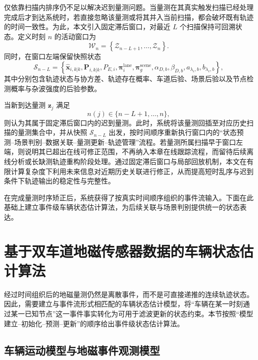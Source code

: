 \documentclass{xdupgthesis}
\begin{document}
仅依靠扫描内排序仍不足以解决迟到量测问题。当量测在其真实触发扫描已经处理完成后才到达系统时，若直接忽略该量测或将其并入当前扫描，都会破坏既有轨迹的时间一致性。为此，本文引入固定滞后窗口，对最近 $L$ 个扫描保持可回溯状态。定义时刻 $n$ 的活动窗口为
\begin{equation}
	\mathcal W_n=
	\left\{
	\mathcal Z_{n-L+1},\ldots,\mathcal Z_n
	\right\}.
	\label{eq:ch3_lag_window}
\end{equation}
同时，在窗口左端保留快照状态
\begin{equation}
	\mathcal S_{n-L}=
	\left\{
	\hat{\mathbf x}_{i,k|k},\mathbf P_{i,k|k},P_{E,i},
	\boldsymbol\pi_i^{\mathrm{lane}},
	\boldsymbol\pi_g^{\mathrm{scene}},
	\alpha_{D,b},\beta_{D,b},a_{\lambda_c,b},b_{\lambda_c,b}
	\right\},
	\label{eq:ch3_snapshot_reorg}
\end{equation}
其中分别包含轨迹状态与协方差、轨迹存在概率、车道后验、场景后验以及节点检测概率与杂波强度的后验参数。

当新到达量测 $\mathbf z_j$ 满足
\begin{equation}
	n(j)\in\{n-L+1,\ldots,n\},
	\label{eq:ch3_late_condition}
\end{equation}
则认为其属于固定滞后窗口内的迟到量测。此时，系统将该量测回插至对应历史扫描的量测集合中，并从快照 $\mathcal S_{n-L}$ 出发，按时间顺序重新执行窗口内的“状态预测--场景判别--数据关联--量测更新--轨迹管理”流程。若量测所属扫描早于窗口左端，则说明其已超出在线可修正范围，不再纳入本章在线跟踪流程，而留待后续离线分析或长缺测轨迹重构阶段处理。通过固定滞后窗口与局部回放机制，本文在有限计算复杂度下利用未来信息对近期历史关联进行修正，从而提高短时乱序与迟到条件下轨迹输出的稳定性与完整性。

在完成量测时序矫正后，系统获得了按真实时间顺序组织的事件流输入。下面在此基础上建立事件级车辆状态估计算法，为后续关联与场景判别提供统一的状态表达。

\section{基于双车道地磁传感器数据的车辆状态估计算法}
\label{sec:ch3_state_estimation}

经过时间组织后的地磁量测仍然是离散事件，而不是可直接递推的连续轨迹状态。因此，需要建立与事件流形式相匹配的车辆状态估计模型，将“车辆在某一时刻通过某一已知节点”这一事件事实转化为可用于滤波更新的状态约束。本节按照“模型建立--初始化--预测--更新”的顺序给出事件级状态估计算法。

\subsection{车辆运动模型与地磁事件观测模型}
\end{document}
